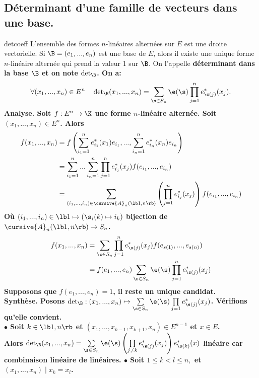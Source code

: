 \documentclass[11pt]{article}
\begin{document}
\subsection{Déterminant d'une famille de vecteurs dans une base.}

\begin{thm}{}{detcoeff}
    L'ensemble des formes $n$-linéaires alternées sur $E$ est une droite vectorielle.\n
    Si $\B=(e_1,...,e_n)$ est une base de $E$, alors il existe une unique forme $n$-linéaire alternée qui prend la valeur 1 sur $\B$. On l'appelle \bf{déterminant dans la base $\B$} et on note $\det_\B$. On a:
    \begin{equation*}
        \forall (x_1,...,x_n)\in E^n \quad \det\nolimits_\B(x_1,...,x_n)=\sum_{\s\in S_n}\e(\s)\prod_{j=1}^ne^*_{\s(j)}(x_j).
    \end{equation*}
    \tcblower
    \bf{Analyse.} Soit $f:E^n\to\K$ une forme $n$-linéaire alternée. Soit $(x_1,...,x_n)\in E^n$. Alors
    \begin{align*}
        f(x_1,...,x_n)&=f\left(\sum_{i_1=1}^ne_{i_1}^*(x_1)e_{i_1},...,\sum_{i_n=1}^ne_{i_n}^*(x_n)e_{i_n}\right)\\
        &= \sum_{i_1=1}^n...\sum_{i_n=1}^n\prod_{j=1}^ne_{i_j}^*(x_j)f(e_{i_1},...,e_{i_n})\\
        &= \sum_{(i_1,...,i_n)\in\cursive{A}_n(\lb1,n\rb)}\left( \prod_{j=1}^ne_{i_j}^*(x_j) \right)f(e_{i_1},...,e_{i_n})
    \end{align*}
    Où $(i_1,...,i_n)\in\lb1 \mapsto (\s_i(k)\mapsto i_k)$ bijection de $\cursive{A}_n(\lb1,n\rb)\to S_n$.
    \begin{align*}
        f(x_1,...,x_n)&=\sum_{\s\in S_n}\prod_{j=1}^ne_{\s(j)}^*(x_j)f(e_{s(1)},...,e_{s(n)})\\
        &=f(e_1,...,e_n)\sum_{\s\in S_n}\e(\s)\prod_{j=1}^ne_{\s(j)}^*(x_j)
    \end{align*}
    Supposons que $f(e_1,...,e_n)=1$, il reste un unique candidat.\\
    \bf{Synthèse.} Posons $\det_\B:(x_1,...,x_n)\mapsto \sum\limits_{\s\in S_n}\e(\s)\prod\limits_{j=1}e_{\s(j)}^*(x_j)$. Vérifions qu'elle convient.\\
    $\bullet$ Soit $k\in\lb1,n\rb$ et $(x_1,...,x_{k-1},x_{k+1},x_n)\in E^{n-1}$ et $x\in E$.\\
    Alors $\det_\B(x_1,...,x_n)=\sum\limits_{\s\in S_n}\e(\s)\left(\prod\limits_{j\neq k}e^*_{\s(j)}(x_j)\right)e^*_{\s(k)}(x)$ linéaire car combinaison linéaire de linéaires.\n
    $\bullet$ Soit $1\leq k < l \leq n,$ et $(x_1,...,x_n) \mid x_k = x_l$.\\

\end{thm}
\end{document}
